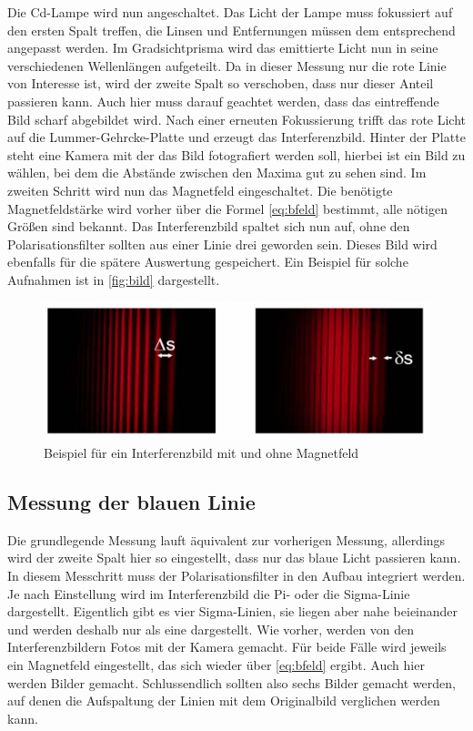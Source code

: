Die Cd-Lampe wird nun angeschaltet.
Das Licht der Lampe muss fokussiert auf den ersten Spalt treffen, die Linsen und Entfernungen müssen dem entsprechend angepasst werden.
Im Gradsichtprisma wird das emittierte Licht nun in seine verschiedenen Wellenlängen aufgeteilt.
Da in dieser Messung nur die rote Linie von Interesse ist, wird der zweite Spalt so verschoben, dass nur dieser Anteil passieren kann. 
Auch hier muss darauf geachtet werden, dass das eintreffende Bild scharf abgebildet wird. 
Nach einer erneuten Fokussierung trifft das rote Licht auf die Lummer-Gehrcke-Platte und erzeugt das Interferenzbild.
Hinter der Platte steht eine Kamera mit der das Bild fotografiert werden soll, hierbei ist ein Bild zu wählen, bei dem die Abstände zwischen den Maxima gut zu sehen sind.
Im zweiten Schritt wird nun das Magnetfeld eingeschaltet. 
Die benötigte Magnetfeldstärke wird vorher über die Formel \autoref{eq:bfeld} bestimmt, alle nötigen Größen sind bekannt. 
Das Interferenzbild spaltet sich nun auf, ohne den Polarisationsfilter sollten aus einer Linie drei geworden sein.
Dieses Bild wird ebenfalls für die spätere Auswertung gespeichert.
Ein Beispiel für solche Aufnahmen ist in \autoref{fig:bild} dargestellt.
\begin{figure}
    \centering
    \includegraphics[width=\textwidth]{images/bild.png}
    \caption{Beispiel für ein Interferenzbild mit und ohne Magnetfeld \cite{V27}}
    \label{fig:bild}
\end{figure}

\subsection{Messung der blauen Linie}
\label{ssec:durch3}

Die grundlegende Messung lauft äquivalent zur vorherigen Messung, allerdings wird der zweite Spalt hier so eingestellt, dass nur das blaue Licht passieren kann.
In diesem Messchritt muss der Polarisationsfilter in den Aufbau integriert werden. 
Je nach Einstellung wird im Interferenzbild die Pi- oder die Sigma-Linie dargestellt. 
Eigentlich gibt es vier Sigma-Linien, sie liegen aber nahe beieinander und werden deshalb nur als eine dargestellt. 
Wie vorher, werden von den Interferenzbildern Fotos mit der Kamera gemacht.
Für beide Fälle wird jeweils ein Magnetfeld eingestellt, das sich wieder über \autoref{eq:bfeld} ergibt.
Auch hier werden Bilder gemacht.
Schlussendlich sollten also sechs Bilder gemacht werden, auf denen die Aufspaltung der Linien mit dem Originalbild verglichen werden kann. 